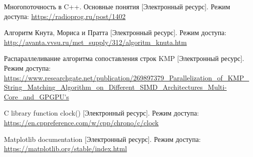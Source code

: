 


\renewcommand\bibname{Список использованных источников}
\begin{thebibliography}{}
	
	 Многопоточность в C++. Основные понятия [Электронный ресурс]. Режим доступа: \url{https://radioprog.ru/post/1402}
	
	 Алгоритм Кнута, Мориса и Пратта [Электронный ресурс]. Режим доступа: \url{http://avanta.vvsu.ru/met_supply/312/algoritm_knuta.htm} 
	
	 Распараллеливание алгоритма сопоставления строк KMP [Электронный ресурс]. Режим доступа: \url{https://www.researchgate.net/publication/269897379_Parallelization_of_KMP_String_Matching_Algorithm_on_Different_SIMD_Architectures_Multi-Core_and_GPGPU's}
	
	 C library function clock() [Электронный ресурс]. Режим доступа: \url{https://en.cppreference.com/w/cpp/chrono/c/clock}
	
	
	 Matplotlib documentation [Электронный ресурс]. Режим доступа: \url{https://matplotlib.org/stable/index.html}
	
\end{thebibliography}
